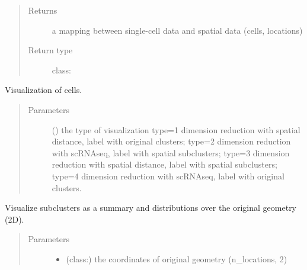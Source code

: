 \documentclass[letterpaper,10pt,english]{sphinxmanual}
\begin{document}
\begin{fulllineitems}
\begin{fulllineitems}
\begin{quote}
\begin{description}
\begin{itemize}
\end{itemize}

\item[{Returns}] \leavevmode
a mapping between single-cell data and spatial data (cells, locations)

\item[{Return type}] \leavevmode
class:

\end{description}\end{quote}

\end{fulllineitems}


\begin{fulllineitems}
\label{\detokenize{api:spaotsc.SpaOTsc.spatial_sc.visualize_cells}}
Visualization of cells.
\begin{quote}\begin{description}
\item[{Parameters}] \leavevmode
{} () \textendash{} the type of visualization type=1 dimension reduction with spatial distance, label with original clusters;
type=2 dimension reduction with scRNAseq, label with spatial subclusters;
type=3 dimension reduction with spatial distance, label with spatial subclusters;
type=4 dimension reduction with scRNAseq, label with original clusters.

\end{description}\end{quote}

\end{fulllineitems}


\begin{fulllineitems}
\label{\detokenize{api:spaotsc.SpaOTsc.spatial_sc.visualize_subclusters}}
Visualize subclusters as a summary and distributions over the original geometry (2D).
\begin{quote}\begin{description}
\item[{Parameters}] \leavevmode\begin{itemize}
\item {} 
 (class:) \textendash{} the coordinates of original geometry (n\_locations, 2)


\end{itemize}
\end{description}
\end{quote}
\end{fulllineitems}
\end{fulllineitems}
\end{document}
